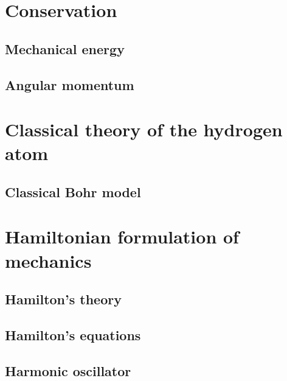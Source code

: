 \section{Conservation}

  \subsection{Mechanical energy}

  \subsection{Angular momentum}

\section{Classical theory of the hydrogen atom}

  \subsection{Classical Bohr model}

\section{Hamiltonian formulation of mechanics}

  \subsection{Hamilton's theory}

  \subsection{Hamilton's equations}

  \subsection{Harmonic oscillator}
